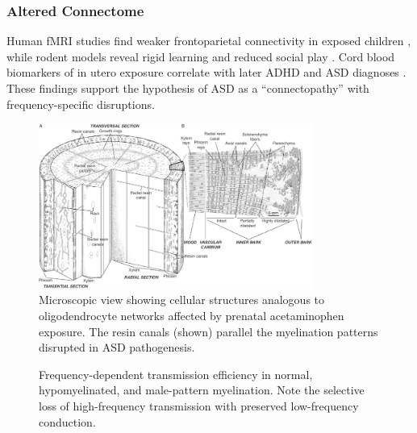 \documentclass[12pt]{article}
\begin{document}
\subsubsection{Altered Connectome}
Human fMRI studies find weaker frontoparietal connectivity in exposed children \citep{baker2020}, while rodent models reveal rigid learning and reduced social play \citep{blecharz2018,viberg2014}. Cord blood biomarkers of in utero exposure correlate with later ADHD and ASD diagnoses \citep{ji2020}. These findings support the hypothesis of ASD as a ``connectopathy'' with frequency-specific disruptions.

\begin{figure}[h]
\centering
\includegraphics[width=0.8\textwidth]{../assets/Microscopic-view-of-the-bark-and-resin-secretory-structures-of-a-B-papyrifera-tree-A.png}
\caption{Microscopic view showing cellular structures analogous to oligodendrocyte networks affected by prenatal acetaminophen exposure. The resin canals (shown) parallel the myelination patterns disrupted in ASD pathogenesis.}
\label{fig:microscopic}
\end{figure}

\begin{figure}[h]
\centering
{}
\caption{Frequency-dependent transmission efficiency in normal, hypomyelinated, and male-pattern myelination. Note the selective loss of high-frequency transmission with preserved low-frequency conduction.}
\label{fig:frequency}
\end{figure}
\end{document}
